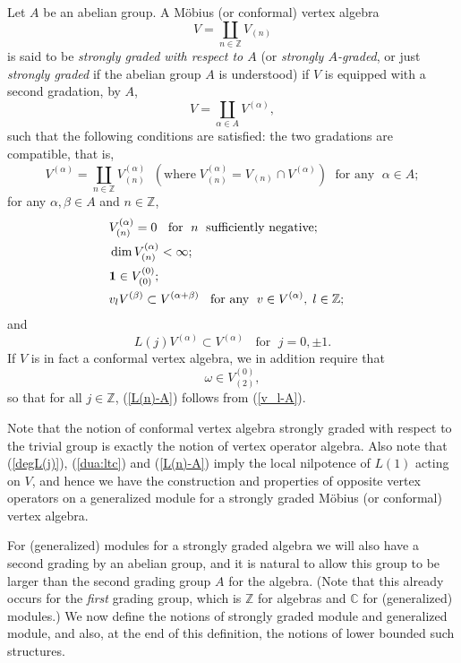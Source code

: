 \documentclass[12pt]{article}
\begin{document}
\begin{defi}\label{def:dgv}
{\rm Let $A$ be an abelian group.  A M\"obius (or conformal) vertex
algebra
\[
V=\coprod_{n\in {\mathbb Z}} V_{(n)}
\]
is said to be {\em strongly graded with respect to $A$} (or {\em
strongly $A$-graded}, or just {\em strongly graded} if the abelian
group $A$ is understood) if $V$ is equipped with a second gradation,
by $A$,
\[
V=\coprod _{\alpha \in A} V^{(\alpha)},
\]
such that the following conditions are satisfied: the two gradations
are compatible, that is,
\[
V^{(\alpha)}=\coprod_{n\in {\mathbb Z}} V^{(\alpha)}_{(n)} \;\;
(\mbox{where}\;V^{(\alpha)}_{(n)}=V_{(n)}\cap V^{(\alpha)})\;
\mbox{ for any }\;\alpha \in A;
\]
for any $\alpha,\beta\in A$ and $n\in {\mathbb Z}$,
\begin{eqnarray}
&V^{(\alpha)}_{(n)}=0\;\;\mbox{ for }\;n\;\mbox{ sufficiently
negative};&\label{dua:ltc}\\
&\dim V^{(\alpha)}_{(n)} <\infty;&\label{dua:fin}\\
&{\bf 1}\in V^{(0)}_{(0)};&\\
&v_l V^{(\beta)} \subset V^{(\alpha+\beta)}\;\;
\mbox{ for any }\;v\in V^{(\alpha)},\;l\in {\mathbb Z};&\label{v_l-A}
\end{eqnarray}
and
\begin{equation}\label{L(n)-A}
L(j)V^{(\alpha)} \subset V^{(\alpha)}\;\;\mbox{ for }\;j=0,\pm 1.
\end{equation}
If $V$ is in fact a conformal vertex algebra, we in addition require
that
\begin{equation}\label{omega0}
\omega\in V^{(0)}_{(2)},
\end{equation}
so that for all $j\in {\mathbb Z}$, (\ref{L(n)-A}) follows {}from
(\ref{v_l-A}).  }
\end{defi}

\begin{rema}\label{rm1}{\rm
Note that the notion of conformal vertex algebra strongly
graded with respect to the trivial group is exactly the notion of
vertex operator algebra. Also note that (\ref{degL(j)}),
(\ref{dua:ltc}) and (\ref{L(n)-A}) imply the local nilpotence of
$L(1)$ acting on $V$, and hence we have the construction and
properties of opposite
vertex operators on a generalized module for a strongly graded
M\"obius (or conformal) vertex algebra. }
\end{rema}

For (generalized) modules for a strongly graded algebra we will also
have a second grading by an abelian group, and it is natural to allow
this group to be larger than the second grading group $A$ for the
algebra.  (Note that this already occurs for the {\em first} grading
group, which is ${\mathbb Z}$ for algebras and ${\mathbb C}$ for
(generalized) modules.)  We now define the notions of strongly graded
module and generalized module, and also, at the end of this
definition, the notions of lower bounded such structures.
\end{document}
